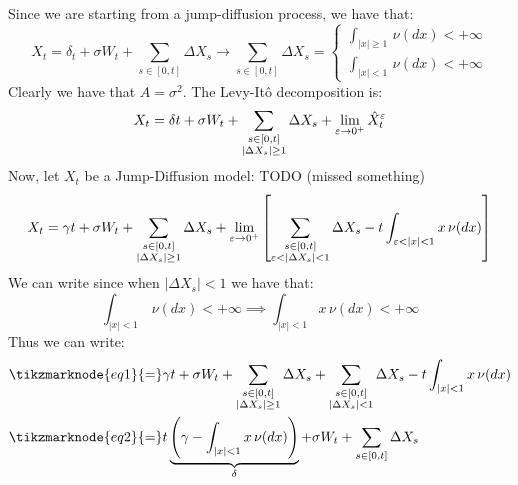 \begin{example}
Since we are starting from a jump-diffusion process, we have that:
\[
    X_t = \delta_t + \sigma W_t + \sum_{s\in[0,t]} \Delta X_s \longrightarrow
   \sum_{s\in[0,t]} \Delta X_s = \left\{\begin{array}{l}\int_{|x|\geq1}\,\nu(dx)
    < +\infty \\ \int_{|x|<1} \, \nu(dx) < +\infty \end{array}\right.
\]
Clearly we have that $A = \sigma^2$. The Levy-Itô decomposition is:
\[
    X_t = \delta t + \sigma W_t + \sum_{\begin{subarray}{c}
        s\in[0,t] \\ |\Delta X_s| \geq 1
    \end{subarray}} \Delta X_s
    + \lim_{ \epsilon \to 0^+} \hat{X}^\epsilon_t
\]
Now, let $X_t$ be a Jump-Diffusion model: TODO (missed something)
\[ X_t = \gamma t + \sigma W_t + \sum_{\begin{subarray}{c}
    s\in[0,t]\\ |\Delta X_s| \geq 1\end{subarray}} \Delta
    X_s + \lim_{\epsilon \to 0^+} \left[ \sum_{\begin{subarray}{c}
        s\in[0,t]\\ \epsilon < |\Delta X_s| < 1
    \end{subarray}} \Delta X_s - t \int_{\epsilon < |x| < 1} x \, \nu(dx) \right]
\]
We can write since when $|\Delta X_s| < 1$ we have that:
\[ \int_{|x|<1} \,\nu(dx) < +\infty \implies \int_{|x|<1} x\,\nu(dx)<+\infty \]
Thus we can write:
\begin{align*}
    & \tikzmarknode{eq1}{=} \gamma t + \sigma W_t + \sum_{\begin{subarray}{c}
        s\in[0,t]\\ |\Delta X_s| \geq 1\end{subarray}}
        \Delta X_s + \sum_{\begin{subarray}{c} 
            s\in[0,t]\\ |\Delta X_s| < 1\end{subarray}} \Delta X_s
    - t \int_{|x|<1} x \,\nu(dx) \\
    & \tikzmarknode{eq2}{=} t \underbrace{\left( \gamma -\int_{|x|<1}x \,\nu(dx)
    \right)}_{\delta} + \sigma W_t + \sum_{s\in[0,t]} \Delta X_s
\end{align*} 
\end{example}

